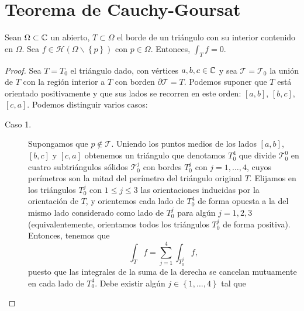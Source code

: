 \section{Teorema de Cauchy-Goursat}
\begin{theorem}
	Sean $\displaystyle \Omega \subset \mathbb{C} $ un abierto, $\displaystyle T \subset \Omega  $ el borde de un triángulo con su interior contenido en $\displaystyle \Omega  $. Sea $\displaystyle f \in \mathcal{H}\left(\Omega \backslash \left\{ p\right\} \right) $ con $\displaystyle p \in \Omega  $. Entonces, $\displaystyle \int _{T}f =0 $.
\end{theorem}
\begin{proof}
	Sea $\displaystyle T = T_{0} $ el triángulo dado, con vértices $\displaystyle a,b,c \in \mathbb{C} $ y sea $\displaystyle \mathcal{T} = \mathcal{T}_{0} $ la unión de $\displaystyle T $ con la región interior a $\displaystyle T $ con borden $\displaystyle \partial \mathcal{T}=T $. Podemos suponer que $\displaystyle T $ está orientado positivamente y que sus lados se recorren en este orden: $\displaystyle \left[a,b\right]  $, $\displaystyle \left[b,c\right]  $, $\displaystyle \left[c,a\right]  $. Podemos distinguir varios casos:
	\begin{description}
		\item[Caso 1.] Supongamos que $\displaystyle p\not\in \mathcal{T} $. Uniendo los puntos medios de los lados $\displaystyle \left[a,b\right]  $, $\displaystyle \left[b,c\right]  $ y $\displaystyle \left[c,a\right]  $ obtenemos un triángulo que denotamos $\displaystyle T^{4}_{0} $ que divide $\displaystyle \mathcal{T}^{0}_{0} $ en cuatro subtriángulos sólidos $\displaystyle \mathcal{T}^{j}_{0} $ con bordes $\displaystyle T^{j}_{0} $ con $\displaystyle j = 1, \ldots, 4 $, cuyos perímetros son la mitad del perímetro del triángulo original $\displaystyle T $. 
Elijamos en los triángulos $\displaystyle T^{j}_{0} $ con $\displaystyle 1 \leq j \leq 3 $ las orientaciones inducidas por la orientación de $\displaystyle T $, y orientemos cada lado de $\displaystyle T^{4}_{0} $ de forma opuesta a la del mismo lado considerado como lado de $\displaystyle T^{j}_{0} $ para algún $\displaystyle j = 1, 2, 3 $ (equivalentemente, orientamos todos los triángulos $\displaystyle T^{j}_{0} $ de forma positiva). Entonces, tenemos que 
\[\int _{T}f =\sum^{4}_{j=1}\int _{T^{j}_{0}}f  ,\]
puesto que las integrales de la suma de la derecha se cancelan mutuamente en cada lado de $\displaystyle T^{4}_{0} $. Debe existir algún $\displaystyle j \in \left\{ 1, \ldots, 4\right\}  $ tal que 

\end{description}
\end{proof}
